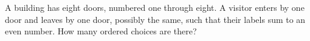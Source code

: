 A building has eight doors, numbered one through eight. A visitor enters by one door and leaves by one door, possibly the same, such that their labels sum to an even number. How many ordered choices are there?

